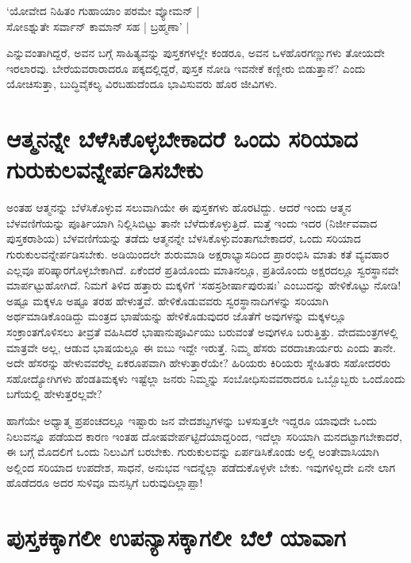 \begin{shloka}
`ಯೋವೇದ ನಿಹಿತಂ ಗುಹಾಯಾಂ ಪರಮೇ ವ್ಯೋಮನ್ |\label{108}\\
ಸೋಽಶ್ನುತೇ ಸರ್ವಾನ್ ಕಾಮಾನ್ ಸಹ | ಬ್ರಹ್ಮಣಾ' |
\end{shloka}
ಎನ್ನುವಂತಾಗಿದ್ದರೆ, ಅವನ ಬಗ್ಗೆ ಸಾಹಿತ್ಯವನ್ನು ಪುಸ್ತಕಗಳಲ್ಲೇ ಕಂಡರೂ, ಅವನ ಒಳಹೊರಗಣ್ಣುಗಳು ತೋಯದೇ ಇರಲಾರವು. ಬೇರೆಯವರಾರಾದರೂ ಪಕ್ಕದಲ್ಲಿದ್ದರೆ, ಪುಸ್ತಕ ನೋಡಿ ಇವನೇಕೆ ಕಣ್ಣೀರು ಬಿಡುತ್ತಾನೆ? ಎಂದು ಯೋಚಿಸುತ್ತಾ, ಬುದ್ಧಿವೈಕಲ್ಯ ವಿರಬಹುದೆಂದೂ ಭಾವಿಸುವರು ಹೊರ ಜೀವಿಗಳು.

\section*{ಆತ್ಮನನ್ನೇ ಬೆಳೆಸಿಕೊಳ್ಳಬೇಕಾದರೆ ಒಂದು ಸರಿಯಾದ ಗುರುಕುಲವನ್ನೇರ್ಪಡಿಸಬೇಕು}

ಅಂತಹ ಆತ್ಮನನ್ನು ಬೆಳೆಸಿಕೊಳ್ಳುವ ಸಲುವಾಗಿಯೇ ಈ ಪುಸ್ತಕಗಳು ಹೊರಟಿದ್ದು. ಆದರೆ ಇಂದು ಆತ್ಮನ ಬೆಳವಣಿಗೆಯನ್ನು ಪೂರ್ತಿಯಾಗಿ ನಿಲ್ಲಿಸಿಬಿಟ್ಟು ತಾನೇ ಬೆಳೆದುಕೊಳ್ಳುತ್ತಿದೆ. ಮತ್ತೆ ಇಂದು ಇದರ (ನಿರ್ಜೀವವಾದ ಪುಸ್ತಕರಾಶಿಯ) ಬೆಳವಣಿಗೆಯನ್ನು ತಡೆದು ಆತ್ಮನನ್ನೇ ಬೆಳಸಿಕೊಳ್ಳುವಂತಾಗಬೇಕಾದರೆ, ಒಂದು ಸರಿಯಾದ ಗುರುಕುಲವನ್ನೇರ್ಪಡಿಸಬೇಕು. ಅಡಿಯಿಂದಲೇ ಶುರುಮಾಡಿ ಅಕ್ಷರಾಭ್ಯಾಸದಿಂದ ಪ್ರಾರಂಭಿಸಿ ಮಾತು ಕತೆ ವ್ಯವಹಾರ ಎಲ್ಲವೂ ಪರಿಷ್ಕಾರಗೊಳ್ಳಬೇಕಾಗಿದೆ. ಏಕೆಂದರೆ ಪ್ರತಿಯೊಂದು ಮಾತಿನಲ್ಲೂ, ಪ್ರತಿಯೊಂದು ಅಕ್ಷರದಲ್ಲೂ ಸ್ವರಸ್ಥಾನವೇ ಮಾರ್ಪಟ್ಟುಹೋಗಿದೆ. ನಿಮಗೆ ತಿಳಿದ ಹತ್ತಾರು ಮಕ್ಕಳಿಗೆ `ಸಹಸ್ರಶೀರ್ಷಾಪುರುಷಃ'\label{108a} ಎಂಬುದನ್ನು ಹೇಳಿಕೊಟ್ಟು ನೋಡಿ! ಅಷ್ಟೂ ಮಕ್ಕಳೂ ಅಷ್ಟೂ ತರಹ ಹೇಳುತ್ತವೆ. ಹೇಳಿಕೊಡುವವರು ಸ್ವರಸ್ಥಾನಾದಿಗಳನ್ನು ಸರಿಯಾಗಿ ಅರ್ಥಮಾಡಿಕೊಂಡಿದ್ದು ಮಂತ್ರದ ಭಾಷೆಯನ್ನು ಹೇಳಿಕೊಡುವುದರ ಜೊತೆಗೆ ಅವುಗಳನ್ನು ಮಕ್ಕಳಲ್ಲೂ ಸಂಕ್ರಾಂತಗೊಳಿಸಲು ತೀವ್ರತೆ ವಹಿಸಿದರೆ ಭಾಷಾನುಪೂರ್ವಿಯು ಬರುವಂತೆ ಅವುಗಳೂ ಬರುತ್ತಿತ್ತು. ವೇದಮಂತ್ರಗಳಲ್ಲಿ ಮಾತ್ರವೇ ಅಲ್ಲ, ಆಡುವ ಭಾಷಯಲ್ಲೂ ಈ ಐಬು ಇದ್ದೇ ಇರುತ್ತೆ. ನಿಮ್ಮ ಹೆಸರು ವರದಾಚಾರ್ಯರು ಎಂದು ತಾನೇ. ಅದೇ ಹೆಸರನ್ನು ಹೇಳುವವರೆಲ್ಲ ಏಕರೂಪವಾಗಿ ಹೇಳುತ್ತಾರೆಯೇ? ಹಿರಿಯರು ಕಿರಿಯರು ಸ್ನೇಹಿತರು ಸಹೋದರರು ಸಹೋದ್ಯೋಗಿಗಳು ಹೆಂಡತಿಮಕ್ಕಳು ಇಷ್ಟೆಲ್ಲಾ ಜನರು ನಿಮ್ಮನ್ನು ಸಂಬೋಧಿಸುವವರಾದರೂ ಒಬ್ಬೊಬ್ಬರು ಒಂದೊಂದು ಬಗೆಯಲ್ಲಿ ಹೇಳುತ್ತರಲ್ಲವೇ?

ಹಾಗೆಯೇ ಅಧ್ಯಾತ್ಮ  ಪ್ರಪಂಚದಲ್ಲೂ ಇಷ್ಟಾರು ಜನ ವೇದಶಬ್ದಗಳನ್ನು ಬಳಸುತ್ತಲೇ ಇದ್ದರೂ ಯಾವುದೇ ಒಂದು ನಿಲುವನ್ನೂ ಪಡೆಯದ ಕಾರಣ ಇಂತಹ ದೋಷವೇರ್ಪಟ್ಟಿದೆಯಾದ್ದರಿಂದ, ಇದೆಲ್ಲಾ ಸರಿಯಾಗಿ ಮನದಟ್ಟಾಗಬೇಕಾದರೆ, ಈ ಬಗ್ಗೆ ಮೊದಲಿಗೆ ಒಂದು ನಿಲುವಿಗೆ ಬರಬೇಕು. ಗುರುಕುಲವನ್ನು ಏರ್ಪಡಿಸಿಕೊಂಡು ಅಲ್ಲಿ ಅಂತೇವಾಸಿಯಾಗಿ ಅಲ್ಲಿಂದ ಸರಿಯಾದ ಉಪದೇಶ, ಸಾಧನೆ, ಅನುಭವ ಇದನ್ನೆಲ್ಲಾ ಪಡೆದುಕೊಳ್ಳಳೇ ಬೇಕು. ಇವುಗಳಿಲ್ಲದೇ ಏನೇ ಲಾಗ ಹೊಡೆದರೂ ಅದರ ಸುಳಿವೂ ಮನಸ್ಸಿಗೆ ಬರುವುದಿಲ್ಲಾಪ್ಪಾ!

\section*{ಪುಸ್ತಕಕ್ಕಾಗಲೀ ಉಪನ್ಯಾಸಕ್ಕಾಗಲೀ ಬೆಲೆ ಯಾವಾಗ}

